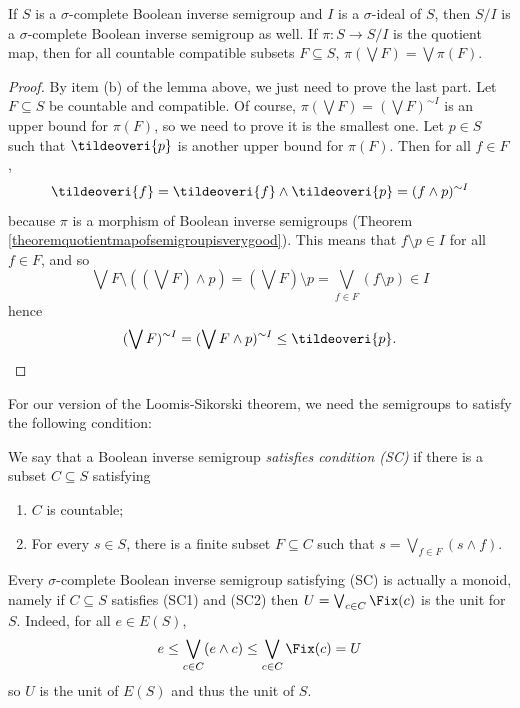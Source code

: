 \begin{theorem}\label{theoremquotientmapsissigma}
If $S$ is a $\sigma$-complete Boolean inverse semigroup and $I$ is a $\sigma$-ideal of $S$, then $S/I$ is a $\sigma$-complete Boolean inverse semigroup as well. If $\pi:S\to S/I$ is the quotient map, then for all countable compatible subsets $F\subseteq S$, $\pi(\bigvee F)=\bigvee\pi(F)$.
\end{theorem}
\begin{proof}
By item (b) of the lemma above, we just need to prove the last part. Let $F\subseteq S$ be countable and compatible. Of course, $\pi(\bigvee F)=\left(\bigvee F\right)^{\sim I}$ is an upper bound for $\pi(F)$, so we need to prove it is the smallest one. Let $p\in S$ such that $\tildeoveri{p}$ is another upper bound for $\pi(F)$. Then for all $f\in F$,
\[\tildeoveri{f}=\tildeoveri{f}\land\tildeoveri{p}=(f\land p)^{\sim I}\]
because $\pi$ is a morphism of Boolean inverse semigroups (Theorem \ref{theoremquotientmapofsemigroupisverygood}). This means that $f\setminus p\in I$ for all $f\in F$, and so
\[\bigvee F\setminus\left((\bigvee F)\land p\right)=(\bigvee F)\setminus p=\bigvee_{f\in F}(f\setminus p)\in I\]
hence
\[(\bigvee F)^{\sim I}=(\bigvee F\land p)^{\sim I}\leq\tildeoveri{p}.\qedhere\]
\end{proof}

For our version of the Loomis-Sikorski theorem, we need the semigroups to satisfy the following condition:

\begin{definition}
We say that a Boolean inverse semigroup \emph{satisfies condition (SC)} if there is a subset $C\subseteq S$ satisfying
\begin{enumerate}
\item[(SC1)] $C$ is countable;
\item[(SC2)] For every $s\in S$, there is a finite subset $F\subseteq C$ such that $s=\bigvee_{f\in F}(s\land f)$.
\end{enumerate}
\end{definition}

\begin{remark}
Every $\sigma$-complete Boolean inverse semigroup satisfying (SC) is actually a monoid, namely if $C\subseteq S$ satisfies (SC1) and (SC2) then $U=\bigvee_{c\in C}\Fix(c)$ is the unit for $S$. Indeed, for all $e\in E(S)$,
\[e\leq\bigvee_{c\in C}(e\land c)\leq\bigvee_{c\in C}\Fix(c)=U\]
so $U$ is the unit of $E(S)$ and thus the unit of $S$.
\end{remark}

